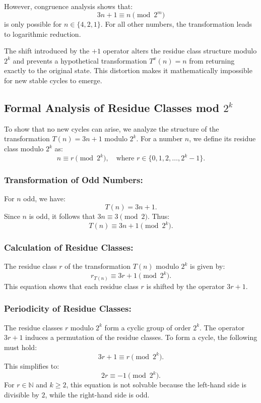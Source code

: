 \documentclass[a4paper,12pt]{article}
\begin{document}
However, congruence analysis shows that:
\[
3n + 1 \equiv n \pmod{2^m}
\]
is only possible for \( n \in \{4, 2, 1\} \). For all other numbers, the transformation leads to logarithmic reduction.

The shift introduced by the \(+1\) operator alters the residue class structure modulo \( 2^k \) and prevents a hypothetical transformation \( T^x(n) = n \) from returning exactly to the original state. This distortion makes it mathematically impossible for new stable cycles to emerge.

\subsection{Formal Analysis of Residue Classes mod \( 2^k \)}
To show that no new cycles can arise, we analyze the structure of the transformation \( T(n) = 3n + 1 \) modulo \( 2^k \). For a number \( n \), we define its residue class modulo \( 2^k \) as:
\[
n \equiv r \pmod{2^k}, \quad \text{where } r \in \{0, 1, 2, \dots, 2^k - 1\}.
\]

\subsubsection{Transformation of Odd Numbers:}
   For \( n \) odd, we have:
   \[
   T(n) = 3n + 1.
   \]
   Since \( n \) is odd, it follows that \( 3n \equiv 3 \pmod{2} \). Thus:
   \[
   T(n) \equiv 3n + 1 \pmod{2^k}.
   \]

\subsubsection{Calculation of Residue Classes:}
   The residue class \( r \) of the transformation \( T(n) \) modulo \( 2^k \) is given by:
   \[
   r_{T(n)} \equiv 3r + 1 \pmod{2^k}.
   \]
   This equation shows that each residue class \( r \) is shifted by the operator \( 3r + 1 \).

\subsubsection{Periodicity of Residue Classes:}
   The residue classes \( r \) modulo \( 2^k \) form a cyclic group of order \( 2^k \). The operator \( 3r + 1 \) induces a permutation of the residue classes. To form a cycle, the following must hold:
   \[
   3r + 1 \equiv r \pmod{2^k}.
   \]
   This simplifies to:
   \[
   2r \equiv -1 \pmod{2^k}.
   \]
   For \( r \in \mathbb{N} \) and \( k \geq 2 \), this equation is not solvable because the left-hand side is divisible by \( 2 \), while the right-hand side is odd.
\end{document}

